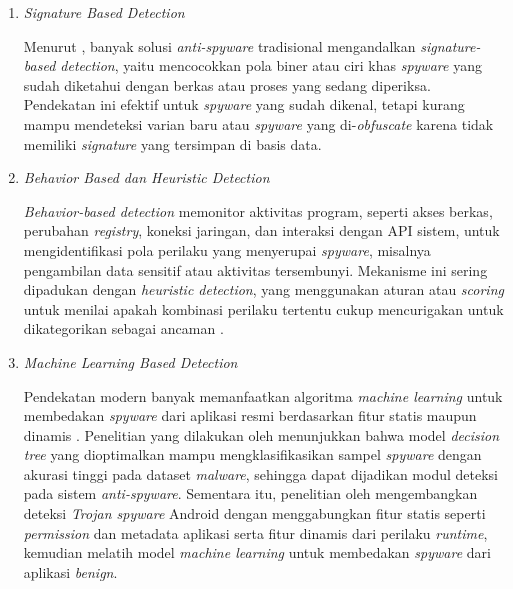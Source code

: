 \begin{enumerate}
    \item \textit{Signature Based Detection}

    Menurut \textcite{baldota2025review}, banyak solusi \textit{anti-spyware} tradisional 
    mengandalkan \textit{signature-based detection}, yaitu mencocokkan pola 
    biner atau ciri khas \textit{spyware} yang sudah diketahui dengan berkas 
    atau proses yang sedang diperiksa. Pendekatan ini efektif untuk 
    \textit{spyware} yang sudah dikenal, tetapi kurang mampu mendeteksi 
    varian baru atau \textit{spyware} yang di-\textit{obfuscate} karena 
    tidak memiliki \textit{signature} yang tersimpan di basis data.

    \item \textit{Behavior Based dan Heuristic Detection}

    \textit{Behavior-based detection} memonitor aktivitas program, seperti 
    akses berkas, perubahan \textit{registry}, koneksi jaringan, dan 
    interaksi dengan API sistem, untuk mengidentifikasi pola perilaku 
    yang menyerupai \textit{spyware}, misalnya pengambilan data sensitif 
    atau aktivitas tersembunyi. Mekanisme ini sering dipadukan dengan 
    \textit{heuristic detection}, yang menggunakan aturan atau 
    \textit{scoring} untuk menilai apakah kombinasi perilaku tertentu 
    cukup mencurigakan untuk dikategorikan sebagai ancaman \autocite{baldota2025review}.

    \item \textit{Machine Learning Based Detection}

    Pendekatan modern banyak memanfaatkan algoritma \textit{machine 
    learning} untuk membedakan \textit{spyware} dari aplikasi resmi 
    berdasarkan fitur statis maupun dinamis \autocite{baldota2025review}. 
    Penelitian yang dilakukan oleh \textcite{abualhaj2024decisiontree} menunjukkan 
    bahwa model \textit{decision tree} yang dioptimalkan mampu 
    mengklasifikasikan sampel \textit{spyware} dengan akurasi tinggi 
    pada dataset \textit{malware}, sehingga dapat dijadikan modul deteksi 
    pada sistem \textit{anti-spyware}. Sementara itu, penelitian oleh 
    \textcite{wang2025atsdetector} mengembangkan deteksi \textit{Trojan spyware} 
    Android dengan menggabungkan fitur statis seperti \textit{permission} 
    dan metadata aplikasi serta fitur dinamis dari perilaku 
    \textit{runtime}, kemudian melatih model \textit{machine learning} 
    untuk membedakan \textit{spyware} dari aplikasi \textit{benign}.


\end{enumerate}
